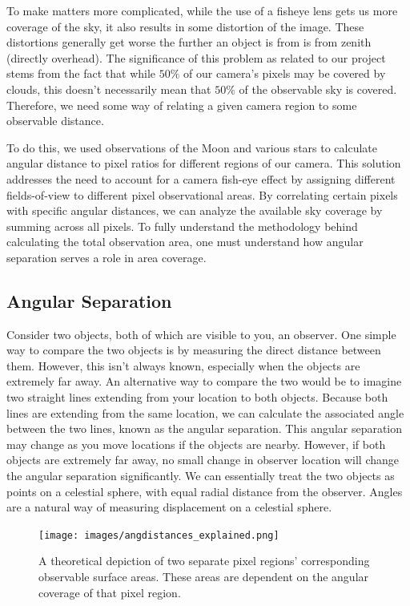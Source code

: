 To make matters more complicated, while the use of a fisheye lens gets us more coverage of the sky, it also results in some distortion of the image.
These distortions generally get worse the further an object is from is from zenith (directly overhead).
The significance of this problem as related to our project stems from the fact that while $50\% $ of our camera's pixels may be covered by clouds, this doesn't necessarily mean that $50\%$ of the observable sky is covered.
Therefore, we need some way of relating a given camera region to some observable distance.

To do this, we used observations of the Moon and various stars to calculate angular distance to pixel ratios for different regions of our camera.
This solution addresses the need to account for a camera fish-eye effect by assigning different fields-of-view to different pixel observational areas.
By correlating certain pixels with specific angular distances, we can analyze the available sky coverage by summing across all pixels.
To fully understand the methodology behind calculating the total observation area, one must understand how angular separation serves a role in area coverage.

\subsection{Angular Separation}

Consider two objects, both of which are visible to you, an observer.
One simple way to compare the two objects is by measuring the direct distance between them.
However, this isn't always known, especially when the objects are extremely far away.
An alternative way to compare the two would be to imagine two straight lines extending from your location to both objects.  
Because both lines are extending from the same location, we can calculate the associated angle between the two lines, known as the angular separation.
This angular separation may change as you move locations if the objects are nearby. However, if both objects are extremely far away, no small change in observer location will change the angular separation significantly.
We can essentially treat the two objects as points on a celestial sphere, with equal radial distance from the observer.  
Angles are a natural way of measuring displacement on a celestial sphere.


\begin{figure}[ht!]
  \centering
  \texttt{[image: images/angdistances\_explained.png]}
  \caption{A theoretical depiction of two separate pixel regions' corresponding observable surface areas.  These areas are dependent on the angular coverage of that pixel region.}
  \label{angdist_exp}
\end{figure}


